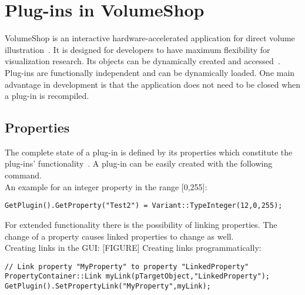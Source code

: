 
\section{Plug-ins in VolumeShop}
VolumeShop is an interactive hardware-accelerated application for direct volume illustration~\cite{proc:volumeshop}. It is designed for developers to have maximum flexibility for visualization research. Its objects can be dynamically created and accessed~\cite{misc:volumeshop101}.\\
\newline
Plug-ins are functionally independent and can be dynamically loaded. One main advantage in development is that the application does not need to be closed when a plug-in is recompiled. 
\subsection{Properties}
The complete state of a plug-in is defined by its properties which constitute the plug-ins' functionality~\cite{misc:volumeshop101}. A plug-in can be easily created with the following command. \\
An example for an integer property in the range [0,255]:
\begin{lstlisting}
GetPlugin().GetProperty("Test2") = Variant::TypeInteger(12,0,255);
\end{lstlisting}

For extended functionality there is the possibility of linking properties. The change of a property causes linked properties to change as well.\\
Creating links in the GUI:
[FIGURE]
Creating links programmatically:
\begin{lstlisting}
// Link property "MyProperty" to property "LinkedProperty"
PropertyContainer::Link myLink(pTargetObject,"LinkedProperty");
GetPlugin().SetPropertyLink("MyProperty",myLink);
\end{lstlisting}

